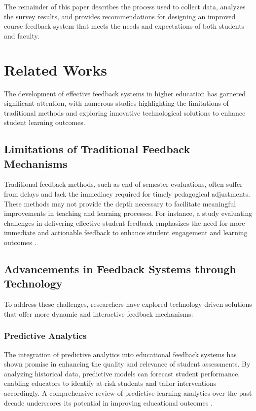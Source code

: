 \documentclass[conference]{IEEEtran}
\begin{document}
The remainder of this paper describes the process used to collect data, analyzes the survey results, and provides recommendations for designing an improved course feedback system that meets the needs and expectations of both students and faculty.


\section{Related Works}

The development of effective feedback systems in higher education has garnered significant attention, with numerous studies highlighting the limitations of traditional methods and exploring innovative technological solutions to enhance student learning outcomes.

\subsection{Limitations of Traditional Feedback Mechanisms}

Traditional feedback methods, such as end-of-semester evaluations, often suffer from delays and lack the immediacy required for timely pedagogical adjustments. These methods may not provide the depth necessary to facilitate meaningful improvements in teaching and learning processes. For instance, a study evaluating challenges in delivering effective student feedback emphasizes the need for more immediate and actionable feedback to enhance student engagement and learning outcomes \cite{article1}.

\subsection{Advancements in Feedback Systems through Technology}

To address these challenges, researchers have explored technology-driven solutions that offer more dynamic and interactive feedback mechanisms:

\subsubsection{Predictive Analytics}

The integration of predictive analytics into educational feedback systems has shown promise in enhancing the quality and relevance of student assessments. By analyzing historical data, predictive models can forecast student performance, enabling educators to identify at-risk students and tailor interventions accordingly. A comprehensive review of predictive learning analytics over the past decade underscores its potential in improving educational outcomes \cite{Sghir2023}.
\end{document}
